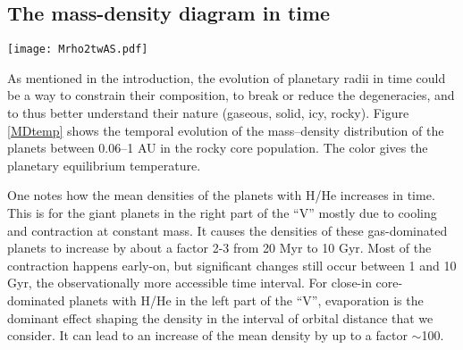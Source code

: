 \documentclass[]{emulateapj}
\def\mearth{M_{\oplus}}
\begin{document}
\begin{enumerate}
\end{enumerate}


\subsection{The mass-density diagram in time}
\begin{figure*}[htb]
 \texttt{[image: Mrho2twAS.pdf]}
 \caption{Temporal evolution of the planetary mass vs. mean density of  planets between 0.06--1 AU in the  population with rocky cores. The color of each point shows the equilibrium temperature of the planet. The dotted and solid lines in the top left corner show the densities of Earth-like and icy cores without H/He, respectively. Note that colors of the planets on the dotted line at for example 1 Gyr give the incorrect impression that there are no, e.g., 1 $\mearth$ planets hotter than about 400 K on that line. In reality, the hotter planet are hidden ``under'' the colder ones by the plotting method. For planets not on the line, there is in contrast no such misleading covering-over, but the colors indicate the real correlation that at fixed total mass $\lesssim 30  \mearth$, hotter planets  have a higher density. In the panel at 10 Gyr, gray open symbols show the same population neglecting atmospheric escape. Note the general contraction of the planets as well as how atmospheric escapes eliminates in time warm and hot low-density planets of low mass. }
  \label{MDtemp}
\end{figure*}


As mentioned in the introduction, the evolution of planetary radii in time could be a way to constrain their composition, to break or reduce the degeneracies, and to thus better understand their nature (gaseous, solid, icy, rocky). Figure \ref{MDtemp} shows the temporal evolution of the mass--density distribution of the planets between 0.06--1 AU in the rocky core population. The color gives the planetary equilibrium temperature. 

One notes how the mean densities of the planets with H/He increases in time. This is for the giant planets in the right part of the ``V'' mostly due to cooling and contraction at constant mass. It causes the densities of these gas-dominated planets to increase by about a factor 2-3 from 20 Myr to 10 Gyr.  Most of the contraction happens early-on, but significant changes still occur between 1 and 10 Gyr, the observationally more accessible time interval. For close-in core-dominated planets with H/He in the left part of the ``V'', evaporation is the dominant effect shaping the density in the interval of orbital distance that we consider. It can lead to an increase of the mean density by up to a factor $\sim$100.
\end{document}
